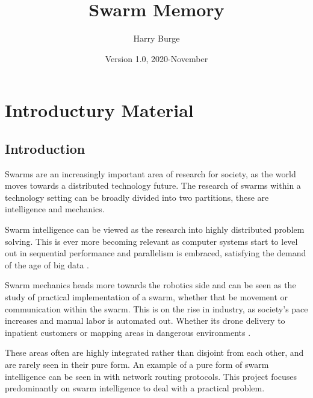 \documentclass{UoYCSproject}
\author{Harry Burge}
\title{Swarm Memory}
\date{Version 1.0, 2020-November}
\begin{document}
\maketitle
\listoffigures
\listoftables



\begin{summary}

\end{summary}


\chapter{Introductury Material}
\label{cha:Introductury Material}

\section{Introduction}
\label{sec:Introduction}

Swarms are an increasingly important area of research for society, as the world moves towards a distributed technology future.
The research of swarms within a technology setting can be broadly divided into two partitions, these are intelligence and mechanics.

Swarm intelligence can be viewed as the research into highly distributed problem solving\cite{Cognitive maps mine detection, Swarm intellegiegence}.
This is ever more becoming relevant as computer systems start to level out in sequential performance \cite{CPU speed} and parallelism is embraced, satisfying the demand of the age of big data \cite{Avalability storage}.

Swarm mechanics heads more towards the robotics side and can be seen as the study of practical implementation of a swarm, whether that be movement or communication within the swarm.
This is on the rise in industry, as society's pace increases and manual labor is automated out. Whether its drone delivery to inpatient customers or mapping areas in dangerous environments \cite{Swarm robotics reviewed}.

These areas often are highly integrated rather than disjoint from each other, and are rarely seen in their pure form.
An example of a pure form of swarm intelligence can be seen in \cite{Swarm intellegiegence} with network routing protocols.
This project focuses predominantly on swarm intelligence to deal with a practical problem.
\end{document}
